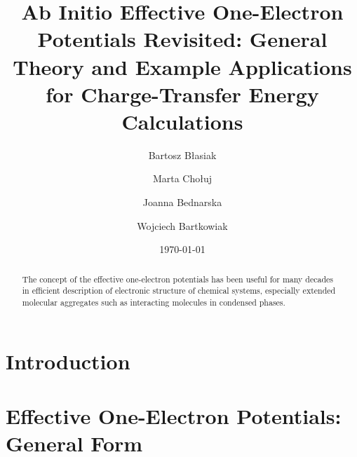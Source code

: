 


\title{Ab Initio Effective One-Electron Potentials Revisited:
General Theory and Example Applications for Charge-Transfer Energy Calculations}

\author{Bartosz B{\l}asiak}

\author{Marta Cho{\l}uj} 
\author{Joanna Bednarska}
\author{Wojciech Bartkowiak}


\date{\today}

\begin{abstract}
The concept of the effective one-electron potentials has been useful for many decades
in efficient description of electronic structure of chemical systems, especially extended
molecular aggregates such as interacting molecules in condensed phases. 
\end{abstract}

\pacs{}

\maketitle

\tableofcontents

\section{\label{s:1}Introduction}

\section{\label{s:2}Effective One-Electron Potentials: General Form}

